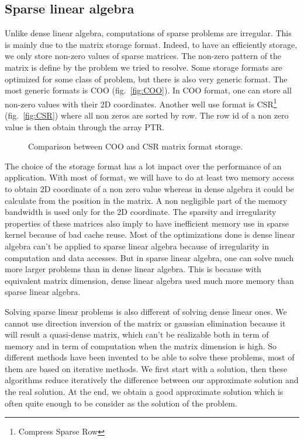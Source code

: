 \subsection{Sparse linear algebra}
Unlike dense linear algebra, computations of sparse problems are irregular.
%
This is mainly due to the matrix storage format.
%
Indeed, to have an efficiently storage, we only store non-zero values of sparse matrices.
%
The non-zero pattern of the matrix is define by the problem we tried to resolve.
%
Some storage formats are optimized for some class of problem, but there is also very generic format.
%
The most generic formats is COO (fig.~\ref{fig:COO}).
%
In COO format, one can store all non-zero values with their 2D coordinates.
%
Another well use format is CSR\footnote{Compress Sparse Row} (fig.~\ref{fig:CSR}) where all non zeros are sorted by row.
%
The row id of a non zero value is then obtain through the array PTR.

\begin{figure}[!ht]
     \begin{center}
    \end{center}
    \caption{Comparison between COO and CSR matrix format storage.}
    \label{fig:matrix_storage}
\end{figure}

The choice of the storage format has a lot impact over the performance of an application.
%
With most of format, we will have to do at least two memory access to obtain 2D coordinate of a non zero value whereas in dense algebra it could be calculate from the position in the matrix.
%
A non negligible part of the memory bandwidth is used only for the 2D coordinate.
%
The sparsity and irregularity properties of these matrices also imply to have inefficient memory use in sparse kernel because of bad cache reuse.
%
Most of the optimizations done is dense linear algebra can't be applied to sparse linear algebra because of irregularity in computation and data accesses.
%
But in sparse linear algebra, one can solve much more larger problems than in dense linear algebra.
%
This is because with equivalent matrix dimension, dense linear algebra used much more memory than sparse linear algebra.


Solving sparse linear problems is also different of solving dense linear ones.
%
We cannot use direction inversion of the matrix or gaussian elimination because it will result a quasi-dense matrix, which can't be realizable both in term of memory and in term of computation when the matrix dimension is high.
%
So different methods have been invented to be able to solve these problems, most of them are based on iterative methods.
%
We first start with a solution, then these algorithms reduce iteratively the difference between our approximate solution and the real solution.
%
At the end, we obtain a good approximate solution which is often quite enough to be consider as the solution of the problem.
